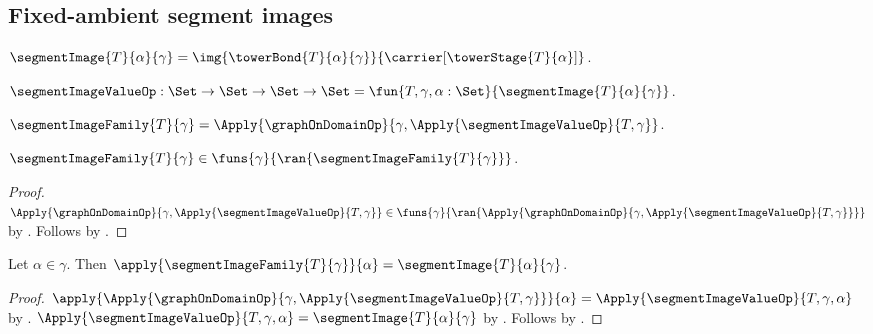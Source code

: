 \subsection{Fixed-ambient segment images}

\begin{definition}\label{segment_image}
    $\segmentImage{T}{\alpha}{\gamma}=
        \img{\towerBond{T}{\alpha}{\gamma}}
            {\carrier[\towerStage{T}{\alpha}]}$.
\end{definition}

\begin{definition}\label{segment_image_value_op}
    $\segmentImageValueOp:
        \Set\to\Set\to\Set\to\Set=
        \fun{T,\gamma,\alpha:\Set}{
            \segmentImage{T}{\alpha}{\gamma}}$.
\end{definition}

\begin{definition}\label{segment_image_family}
    $\segmentImageFamily{T}{\gamma}=
        \Apply{\graphOnDomainOp}
            {\gamma,\Apply{\segmentImageValueOp}{T,\gamma}}$.
\end{definition}

\begin{proposition}\label{segment_image_family_type}
    $\segmentImageFamily{T}{\gamma}\in
        \funs{\gamma}{\ran{\segmentImageFamily{T}{\gamma}}}$.
\end{proposition}
\begin{proof}
    $\Apply{\graphOnDomainOp}
            {\gamma,\Apply{\segmentImageValueOp}{T,\gamma}}
        \in\funs{\gamma}{
            \ran{\Apply{\graphOnDomainOp}
                {\gamma,\Apply{\segmentImageValueOp}{T,\gamma}}}}$ by
        .
    Follows by .
\end{proof}

\begin{proposition}\label{segment_image_family_apply}
    Let $\alpha\in\gamma$.
    Then $\apply{\segmentImageFamily{T}{\gamma}}{\alpha}=
        \segmentImage{T}{\alpha}{\gamma}$.
\end{proposition}
\begin{proof}
    $\apply{
        \Apply{\graphOnDomainOp}
            {\gamma,\Apply{\segmentImageValueOp}{T,\gamma}}}
        {\alpha}=
        \Apply{\segmentImageValueOp}{T,\gamma,\alpha}$
        by .
    $\Apply{\segmentImageValueOp}{T,\gamma,\alpha}
        =\segmentImage{T}{\alpha}{\gamma}$ by
        .
    Follows by .
\end{proof}

